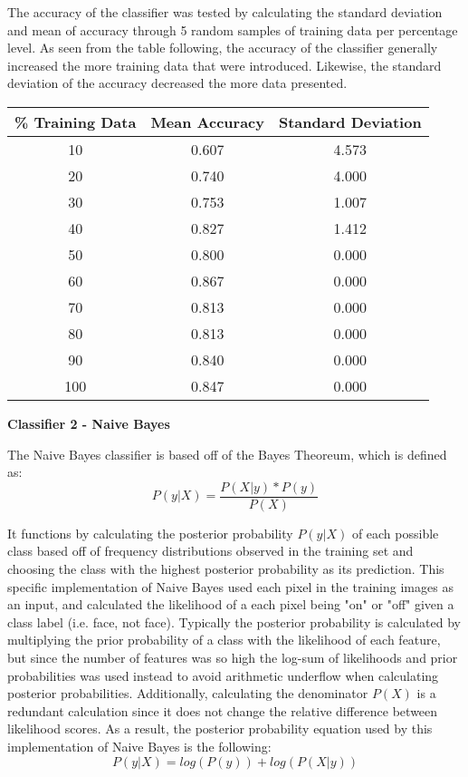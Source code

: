 \documentclass[11pt]{article}
\begin{document}
    The accuracy of the classifier was tested by calculating the standard deviation and mean of accuracy through 5 random samples of training data per percentage level. As seen from the table following, the accuracy of the classifier generally increased the more training data that were introduced. Likewise, the standard deviation of the accuracy decreased the more data presented. \\
    \begin{center}
    \begin{tabular}{||c c c||} 
     \hline
     \% Training Data & Mean Accuracy & Standard Deviation \\ [0.5ex] 
     \hline\hline
     10 & 0.607 & 4.573 \\ 
     \hline
     20 & 0.740 & 4.000 \\ 
     \hline
     30 & 0.753 & 1.007 \\ 
     \hline
     40 & 0.827 & 1.412 \\ 
     \hline
     50 & 0.800 & 0.000 \\ 
     \hline
     60 & 0.867 & 0.000 \\ 
     \hline
     70 & 0.813 & 0.000 \\ 
     \hline
     80 & 0.813 & 0.000 \\ 
     \hline
     90 & 0.840 & 0.000 \\ 
     \hline
     100 & 0.847 & 0.000 \\ 
     \hline
    \end{tabular}
    \end{center}
    \newpage
    \begin{center}
        \Large
        \textbf{Classifier 2 - Naive Bayes}
    \end{center}
    \normalsize
    The Naive Bayes classifier is based off of the Bayes Theoreum, which is defined as:\\
    
    \[P(y|X) = \frac{P(X|y)*P(y)}{P(X)}\]
    
    It functions by calculating the posterior probability $P(y|X)$ of each possible class based off of frequency distributions observed in the training set and choosing the class with the highest posterior probability as its prediction. This specific implementation of Naive Bayes used each pixel in the training images as an input, and calculated the likelihood of a each pixel being "on" or "off" given a class label (i.e. face, not face). Typically the posterior probability is calculated by multiplying the prior probability of a class  with the likelihood of each feature, but since the number of features was so high the log-sum of likelihoods and prior probabilities was used instead to avoid arithmetic underflow when calculating posterior probabilities. Additionally, calculating the denominator $P(X)$ is a redundant calculation since it does not change the relative difference between likelihood scores. As a result, the posterior probability equation used by this implementation of Naive Bayes is the following:\\ 
    \[P(y|X) = log(P(y)) + log(P(X|y))\]
    
\end{document}
